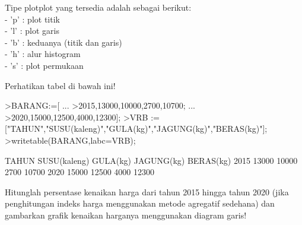 \documentclass[a4paper,10pt]{article}
\begin{document}
\begin{eulernotebook}
\begin{eulercomment}
\begin{eulercomment}
\begin{eulercomment}
\begin{eulercomment}
\begin{eulercomment}
\begin{eulercomment}
\begin{eulercomment}
\begin{eulercomment}
\begin{eulercomment}
\begin{eulercomment}
\begin{eulercomment}
\begin{eulercomment}
\begin{eulercomment}
\begin{eulercomment}
\begin{eulercomment}
\begin{eulercomment}
\begin{eulercomment}
\begin{eulercomment}
\begin{eulercomment}
Tipe plotplot yang tersedia adalah sebagai berikut:\\
- 'p' : plot titik\\
- 'l' : plot garis\\
- 'b' : keduanya (titik dan garis)\\
- 'h' : alur histogram\\
- 's' : plot permukaan
\end{eulercomment}
\eulersubheading{}
\begin{eulercomment}
Perhatikan tabel di bawah ini!
\end{eulercomment}
\begin{eulerprompt}
>BARANG:=[ ...
>2015,13000,10000,2700,10700; ...
>2020,15000,12500,4000,12300];
>VRB := ["TAHUN","SUSU(kaleng)","GULA(kg)","JAGUNG(kg)","BERAS(kg)"];
>writetable(BARANG,labc=VRB);
\end{eulerprompt}
\begin{euleroutput}
       TAHUN SUSU(kaleng)  GULA(kg) JAGUNG(kg) BERAS(kg)
        2015        13000     10000       2700     10700
        2020        15000     12500       4000     12300
\end{euleroutput}
\begin{eulercomment}
Hitunglah persentase kenaikan harga dari tahun 2015 hingga tahun 2020
(jika penghitungan indeks harga menggunakan metode agregatif sedehana)
dan gambarkan grafik kenaikan harganya menggunakan diagram garis!


\end{eulercomment}
\end{eulercomment}
\end{eulercomment}
\end{eulercomment}
\end{eulercomment}
\end{eulercomment}
\end{eulercomment}
\end{eulercomment}
\end{eulercomment}
\end{eulercomment}
\end{eulercomment}
\end{eulercomment}
\end{eulercomment}
\end{eulercomment}
\end{eulercomment}
\end{eulercomment}
\end{eulercomment}
\end{eulercomment}
\end{eulercomment}
\end{eulernotebook}
\end{document}
